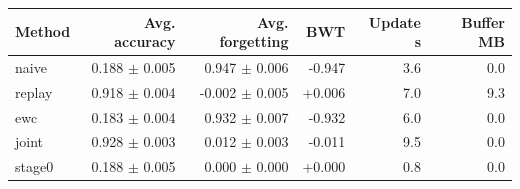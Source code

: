\begin{tabular}{lrrrrr}
\toprule
Method & Avg. accuracy & Avg. forgetting & BWT & Update s & Buffer MB \\
\midrule
naive & 0.188 $\pm$ 0.005 & 0.947 $\pm$ 0.006 & -0.947 & 3.6 & 0.0 \\
replay & 0.918 $\pm$ 0.004 & -0.002 $\pm$ 0.005 & +0.006 & 7.0 & 9.3 \\
ewc & 0.183 $\pm$ 0.004 & 0.932 $\pm$ 0.007 & -0.932 & 6.0 & 0.0 \\
joint & 0.928 $\pm$ 0.003 & 0.012 $\pm$ 0.003 & -0.011 & 9.5 & 0.0 \\
stage0 & 0.188 $\pm$ 0.005 & 0.000 $\pm$ 0.000 & +0.000 & 0.8 & 0.0 \\
\bottomrule
\end{tabular}
